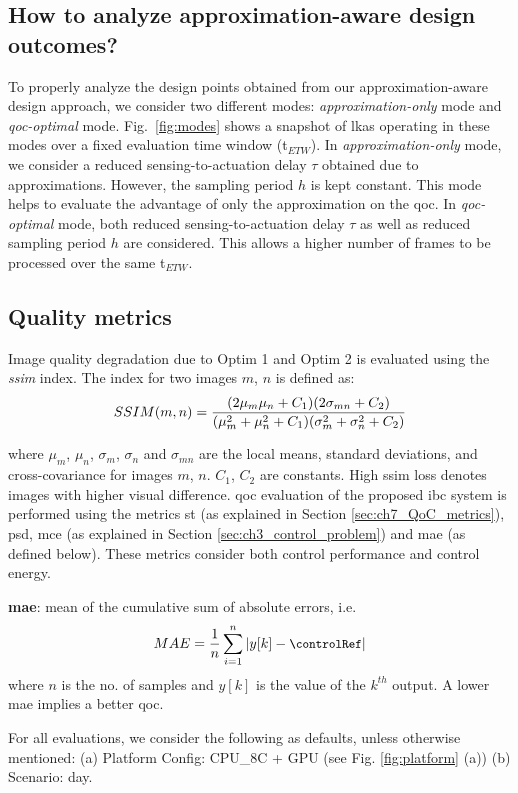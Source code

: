 \subsection{How to analyze approximation-aware design outcomes?}\label{analyze}
To properly analyze the design points obtained from our approximation-aware design approach,  we consider two different modes: \textit{approximation-only} mode and \textit{\gls{qoc}-optimal} mode. Fig.\ \ref{fig:modes} shows a snapshot of \gls{lkas} operating in these modes over a fixed evaluation time window (t$_{ETW}$). In \textit{approximation-only} mode, we consider a reduced sensing-to-actuation delay $\tau$ obtained due to approximations. However, the sampling period $h$ is kept constant.
This mode helps to evaluate the advantage of only the approximation on the \gls{qoc}.
In \textit{\gls{qoc}-optimal} mode, both reduced sensing-to-actuation delay $\tau$ as well as reduced sampling period $h$ are considered. This allows a higher number of frames to be processed over the same t$_{ETW}$.

\subsection{Quality metrics}\label{metrics}
Image quality degradation due to Optim 1 and Optim 2 is evaluated using the \textit{\acrfull{ssim}} index. The  index for two images $m$, $n$ is defined as:
\vspace{5 pt}
\begin{equation} 
\small
SSIM(m, n) = \dfrac{(2\mu_{m}\mu_{n} + C_{1})(2\sigma_{mn} + C_{2})}{(\mu_{m}^2 + \mu_{n}^2 + C_{1})(\sigma_{m}^2 + \sigma_{n}^2 + C_{2})} 
\nonumber
\end{equation}
\normalsize
\par where $\mu_{m}$, $\mu_{n}$, $\sigma_{m}$, $\sigma_{n}$ and $\sigma_{mn}$ are the local means, standard deviations, and cross-covariance for images $m$, $n$. $C_{1}$, $C_{2}$ are constants. High \gls{ssim} loss denotes images with higher visual difference.
\Gls{qoc} evaluation of the proposed \gls{ibc} system is performed using the metrics \gls{st} (as explained in Section \ref{sec:ch7_QoC_metrics}), \gls{psd}, \gls{mce} (as explained in Section \ref{sec:ch3_control_problem}) and \gls{mae} (as defined below). These metrics consider both control performance and control energy.

  \noindent\textbf{\Acrfull{mae}}: mean of the cumulative sum of absolute errors, i.e.
    \begin{equation} 
    \small
    MAE = \dfrac{1}{n}\sum_{i=1}^{n} |y[k] - \controlRef|
   \nonumber
    \end{equation}
    \normalsize
    where $n$ is the no. of samples and $y[k]$ is the value of the $k^{th}$ output. A lower \gls{mae} implies a better \gls{qoc}.

For all evaluations, we consider the following as defaults, unless otherwise mentioned: 
(a) Platform Config: CPU\_8C + GPU (see Fig. \ref{fig:platform} (a)) (b) Scenario: day.